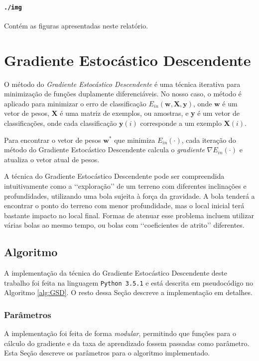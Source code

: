 \documentclass[a4paper, 12pt]{article}
\begin{document}
\paragraph{\texttt{./img}} Contém as figuras apresentadas neste relatório.

\section{Gradiente Estocástico Descendente}

O método do \textit{Gradiente Estocástico Descendente} é uma técnica iterativa
para minimização de funções duplamente diferenciáveis. No nosso caso, o método
é aplicado para minimizar o erro de classificação $E_{in}(\textbf{w},
\textbf{X}, \textbf{y})$, onde $\textbf{w}$ é um vetor de pesos, \textbf{X} é
uma matriz de exemplos, ou amostras, e \textbf{y} é um vetor de classificações,
onde cada classificação $\textbf{y}(i)$ corresponde a um exemplo
$\textbf{X}(i)$.

Para encontrar o vetor de pesos $\textbf{w}^{*}$ que minimiza $E_{in}(\cdot)$,
cada iteração do método do Gradiente Estocástico Descendente calcula o
\textit{gradiente} $\nabla{}E_{in}(\cdot)$ e atualiza o vetor atual de pesos.

A técnica do Gradiente Estocástico Descendente pode ser compreendida
intuitivamente como a \lq\lq{}exploração\rq\rq{} de um terreno com diferentes
inclinações e profundidades, utilizando uma bola sujeita à força da gravidade.
A bola tenderá a encontrar o ponto do terreno com menor profundidade, mas o
local inicial terá bastante impacto no local final. Formas de atenuar esse
problema incluem utilizar várias bolas ao mesmo tempo, ou bolas com
\lq\lq{}coeficientes de atrito\rq\rq{} diferentes.

\subsection{Algoritmo}

A implementação da técnica do Gradiente Estocástico Descendente deste trabalho
foi feita na linguagem \texttt{Python 3.5.1} e está descrita em pseudocódigo no
Algoritmo \ref{alg:GSD}. O resto dessa Seção descreve a implementação em
detalhes.

\subsubsection{Parâmetros}

A implementação foi feita de forma \textit{modular}, permitindo que funções
para o cálculo do gradiente e da taxa de aprendizado fossem passadas como
parâmetro. Esta Seção descreve os parâmetros para o algoritmo implementado.
\end{document}
